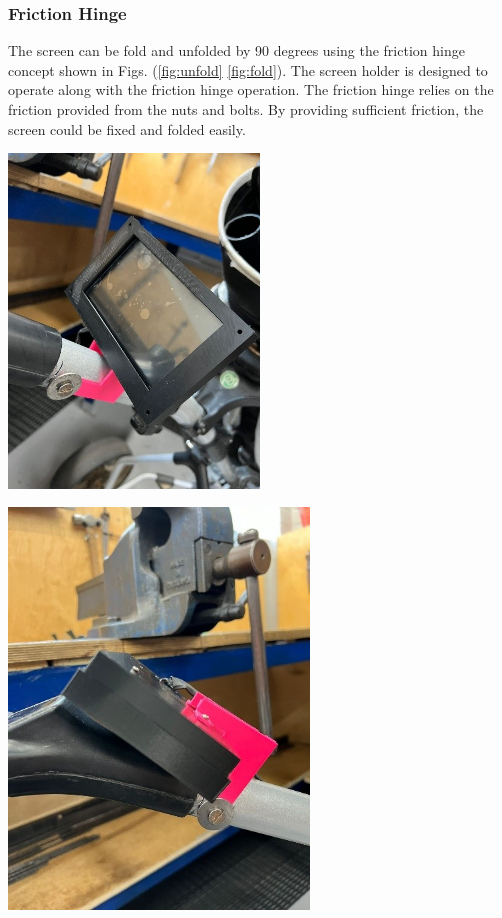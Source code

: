 \documentclass[11pt,landscape]{article}
\newenvironment{Figure}
  {\par\medskip\noindent\minipage{\linewidth}}
  {\endminipage\par\medskip}
\begin{document}
\begin{multicols}{3}
    \subsubsection{Friction Hinge}
    The screen can be fold and unfolded by 90 degrees using the friction hinge
    concept shown in Figs. (\ref{fig:unfold} \ref{fig:fold}). The screen
    holder is designed to operate along with the friction hinge operation. The
    friction hinge relies on the friction provided from the nuts and bolts. By
    providing sufficient friction, the screen could be fixed and folded easily.
    
    \begin{Figure}
        \begin{center}
            \includegraphics[width=0.5\textwidth]{Figure17.jpg}
            \label{fig:unfold}
        \end{center}
    \end{Figure}
    
    \begin{Figure}
        \begin{center}
            \includegraphics[width=0.6\textwidth]{Figure18.jpg}
            \label{fig:fold}
        \end{center}
    \end{Figure}
    

\end{multicols}
\end{document}
